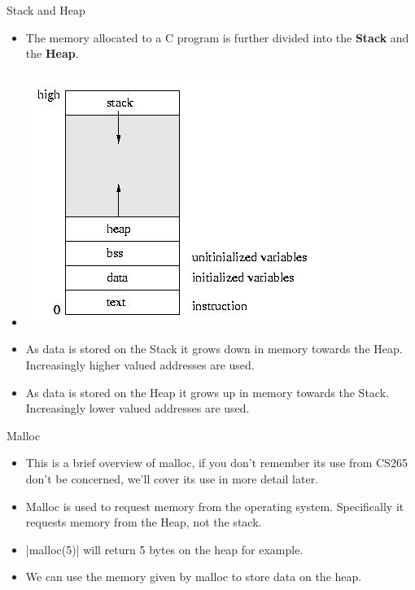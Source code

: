 \documentclass{beamer}
\begin{document}
\begin{frame}{Stack and Heap}
	\begin{itemize}[<+->]
	\item The memory allocated to a C program is further divided into the {\bf Stack} and the {\bf Heap}.

	\item \includegraphics[scale=0.40]{imgs/stackandheap.jpeg}

	\item As data is stored on the Stack it grows down in memory towards the Heap. Increasingly higher valued addresses are used.

	\item As data is stored on the Heap it grows up in memory towards the Stack. Increasingly lower valued addresses are used.

	\end{itemize}
\end{frame}

\begin{frame}{Malloc}
	\begin{itemize}[<+->]
		\item This is a brief overview of malloc, if you don't remember its use from CS265 don't be concerned, we'll cover its use in more detail later.

		\item Malloc is used to request memory from the operating system. Specifically it requests memory from the Heap, not the stack.

		\item {}|malloc(5)| will return 5 bytes on the heap for example.

		\item We can use the memory given by malloc to store data on the heap.
	\end{itemize}
\end{frame}
\end{document}
